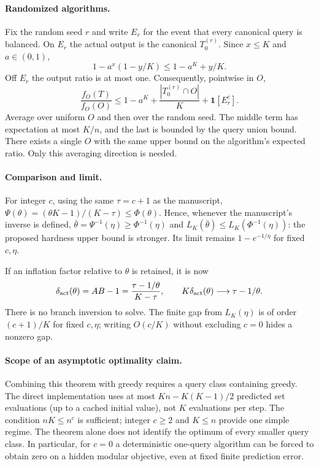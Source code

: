 \paragraph{Randomized algorithms.}
Fix the random seed $r$ and write $E_r$ for the event that every canonical
query is balanced. On $E_r$ the actual output is the canonical
$T_0^{(r)}$. Since $x\le K$ and $a\in(0,1)$,
\[
 1-a^x(1-y/K)\le1-a^K+y/K.
\]
Off $E_r$ the output ratio is at most one. Consequently, pointwise in $O$,
\[
 \frac{f_O(T)}{f_O(O)}\le
 1-a^K+\frac{|T_0^{(r)}\cap O|}{K}+\mathbf1[E_r^c].
\]
Average over uniform $O$ and then over the random seed. The middle term has
expectation at most $K/n$, and the last is bounded by the query union bound.
There exists a single $O$ with the same upper bound on the algorithm's
expected ratio. Only this averaging direction is needed.

\paragraph{Comparison and limit.}
For integer $c$, using the same $\tau=c+1$ as the manuscript,
$\Psi(\theta)=(\theta K-1)/(K-\tau)\le\Phi(\theta)$. Hence, whenever the
manuscript's inverse is defined,
$\bar\theta=\Psi^{-1}(\eta)\ge\Phi^{-1}(\eta)$ and
$L_K(\bar\theta)\le L_K(\Phi^{-1}(\eta))$: the proposed hardness upper bound
is stronger. Its limit remains $1-e^{-1/\eta}$ for fixed $c,\eta$.

If an inflation factor relative to $\theta$ is retained, it is now
\[
 \delta_{\rm act}(\theta)=AB-1
 =\frac{\tau-1/\theta}{K-\tau},\qquad
 K\delta_{\rm act}(\theta)\longrightarrow\tau-1/\theta.
\]
There is no branch inversion to solve. The finite gap from $L_K(\eta)$ is
of order $(c+1)/K$ for fixed $c,\eta$; writing $O(c/K)$ without excluding
$c=0$ hides a nonzero gap.

\paragraph{Scope of an asymptotic optimality claim.}
Combining this theorem with greedy requires a query class containing greedy.
The direct implementation uses at most
$Kn-K(K-1)/2$ predicted set evaluations (up to a cached initial value),
not $K$ evaluations per step. The condition $nK\le n^c$ is sufficient;
integer $c\ge2$ and $K\le n$ provide one simple regime. The theorem alone
does not identify the optimum of every smaller query class. In particular,
for $c=0$ a deterministic one-query algorithm can be forced to obtain zero
on a hidden modular objective, even at fixed finite prediction error.
